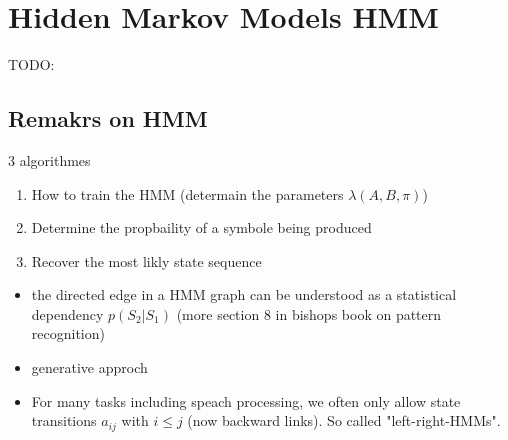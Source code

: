 
\section*{Hidden Markov Models HMM}
TODO:

\subsection*{Remakrs on HMM}

3 algorithmes
\begin{enumerate}
    \item  How to train the HMM (determain the parameters $\lambda (A, B, \pi)$)
    \item  Determine the propbaility of a symbole being produced
    \item  Recover the most likly state sequence
\end{enumerate}

\begin{itemize}
    \item the directed edge in a HMM graph can be understood as a statistical dependency $p(S_2|S_1)$ (more section 8 in bishops book on pattern recognition)
    \item generative approch
    \item For many tasks including speach processing, we often only allow state transitions $a_{ij}$ with $i \le j$ (now backward links). So called "left-right-HMMs".
\end{itemize}
